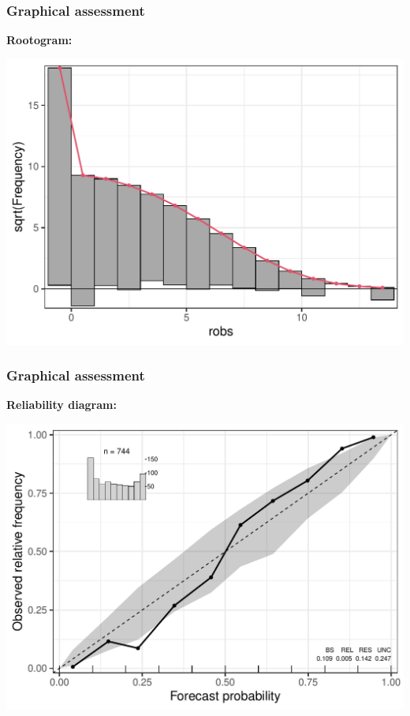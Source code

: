 \documentclass[11pt,t,usepdftitle=false,aspectratio=169]{beamer}
\begin{document}
\begin{frame}[fragile]
\frametitle{Graphical assessment}

\vspace{-0.75em}

\textbf{Rootogram:}  

\vspace{0.25em}

\begin{center}
\includegraphics{slides-rain_topmodels_df_rootogram}
\end{center}
\end{frame}


\begin{frame}[fragile]
\frametitle{Graphical assessment}

\vspace{-0.75em}

\textbf{Reliability diagram:}  

\vspace{0.25em}

\begin{center}
\includegraphics{slides-rain_topmodels_df_reliagram}
\end{center}
\end{frame}
\end{document}
